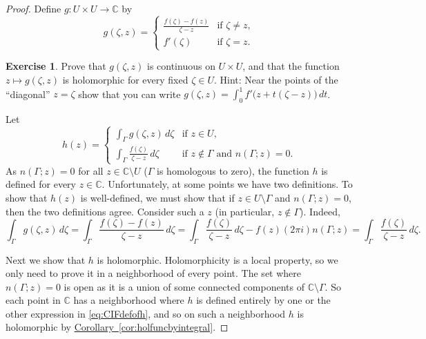 \documentclass[12pt,openany]{book}
\newcommand{\C}{{\mathbb{C}}}
\newcommand{\myquote}[1]{``#1''}
\theoremstyle{plain}
\theoremstyle{remark}
\theoremstyle{definition}
\newenvironment{exbox}{%
    \def\FrameCommand{\vrule width 1pt \relax\hspace{10pt}}%
    \MakeFramed{\advance\hsize-\width\FrameRestore}%
}{%
    \endMakeFramed
}
\theoremstyle{exercise}
\newtheorem{exercise}{Exercise}[section]
\theoremstyle{example}
\newcommand{\corref}[1]{\hyperref[#1]{Corollary~\ref*{#1}}}
\begin{document}
\begin{proof}
Define $g \colon U \times U \to \C$ by
\begin{equation*}
g(\zeta,z) =
\begin{cases}
\frac{f(\zeta)-f(z)}{\zeta-z} & \text{if } \zeta \neq z , \\
f'(\zeta)                 & \text{if } \zeta = z .
\end{cases}
\end{equation*}

\begin{exbox}
\begin{exercise}
Prove that $g(\zeta,z)$ is continuous on $U \times U$, and that
the function $z \mapsto g(\zeta,z)$ is holomorphic for every fixed $\zeta \in U$.
Hint: Near the points of the \myquote{diagonal} $z=\zeta$
show that you can write $g(\zeta,z) = \int_0^1 f'\bigl(z+t(\zeta-z)\bigr)\, dt$.
\end{exercise}
\end{exbox}

Let
\begin{equation}\label{eq:CIFdefofh}
h(z) = 
\begin{cases}
\int_\Gamma g(\zeta,z) \, d\zeta & \text{if } z \in U , \\
\int_\Gamma \frac{f(\zeta)}{\zeta-z} \, d\zeta & \text{if } z \not \in
\Gamma \text{ and } n(\Gamma;z) = 0 .
\end{cases}
\end{equation}
As $n(\Gamma;z) = 0$ for all $z \in \C \setminus U$
($\Gamma$ is homologous to zero),
the function $h$ is defined for every $z \in \C$.
Unfortunately, at some points
we have two definitions.
To show that $h(z)$ is well-defined, we must show that if
$z \in U \setminus \Gamma$ and
$n(\Gamma;z) = 0$, then the two definitions agree.
Consider such a $z$ (in particular, $z \notin \Gamma$).  Indeed,
\begin{equation*}
\int_\Gamma g(\zeta,z) \, d\zeta
=
\int_\Gamma \frac{f(\zeta)-f(z)}{\zeta-z} \, d\zeta
=
\int_\Gamma \frac{f(\zeta)}{\zeta-z} \, d\zeta
-
f(z) (2\pi i) n(\Gamma;z)
=
\int_\Gamma \frac{f(\zeta)}{\zeta-z} \, d\zeta .
\end{equation*}

Next we show that $h$ is
holomorphic.
Holomorphicity is a local property, so we only need to prove it 
in a neighborhood of every point.
The set where $n(\Gamma;z) = 0$ is open as it is a
union of some connected components of $\C \setminus \Gamma$.
So each point in $\C$ has a neighborhood where $h$ is defined
entirely by one or the other expression in \eqref{eq:CIFdefofh},
and so on such a neighborhood $h$ is holomorphic by
\corref{cor:holfuncbyintegral}.


\end{proof}
\end{document}
